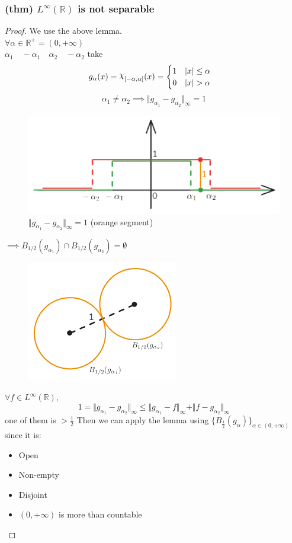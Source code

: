 \subsubsection{(thm) $L^\infty(\mathbb R)$ is not separable}
\begin{proof}
    We use the above lemma.\\
    $\forall \alpha\in \mathbb R^+=(0,+\infty)$\\
    $\alpha_1\quad -\alpha_1\quad \alpha_2\quad -\alpha_2$
    take $$g_\alpha (x)=\rchi_{[-\alpha, \alpha]}(x)=\begin{cases}
        1\quad |x|\leq \alpha \\
        0\quad |x|>\alpha
    \end{cases}$$
$$\alpha_1\neq \alpha_2 \implies \Vert g_{\alpha_1}-g_{\alpha_2}\Vert_\infty=1$$

\begin{figure}[H]
    \centering
    \includegraphics[width=0.5\linewidth]{assets/g_alpha1&2.png}
    \caption{$\Vert g_{\alpha_1}-g_{\alpha_2}\Vert_{\infty}=1$ (orange segment)}
    \label{fig:enter-label}
\end{figure}
$\implies B_{1/2}(g_{\alpha_1})\cap B_{1/2}(g_{\alpha_2})=\emptyset $
\begin{figure}[H]
    \centering
    \includegraphics[width=0.3\linewidth]{assets/12balls_in_g_alpha.png}
    \label{fig:enter-label}
\end{figure}
$\forall f\in L^\infty(\mathbb R)$,\\
$$1=\Vert g_{\alpha_1}-g_{\alpha_2}\Vert_\infty\leq \Vert g_{\alpha_1}-f\Vert_\infty +\Vert f-g_{\alpha_2}\Vert_\infty$$ one of them is $>\frac 12$
Then we can apply the lemma using $\{B_{\frac12}(g_\alpha)\}_{\alpha\in (0,+\infty)}$ since it is:
\begin{itemize}
    \item Open
    \item Non-empty
    \item Disjoint
    \item $(0,+\infty)$ is more than countable
\end{itemize}
\end{proof}
